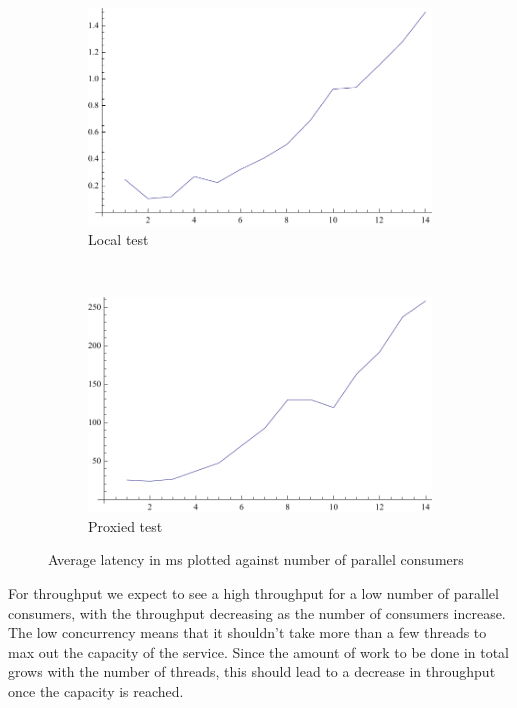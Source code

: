 \documentclass[11pt,a4paper]{article}
\begin{document}
\begin{figure}[h!]
    \centering
    \begin{subfigure}[b]{.4\textwidth}
        \includegraphics[width=\textwidth]{../analysis/latency-local-kris.pdf}
        \caption{Local test}
    \end{subfigure}
    \,
    \begin{subfigure}[b]{.4\textwidth}
        \includegraphics[width=\textwidth]{../analysis/latency-remote-kris.pdf}
        \caption{Proxied test}
    \end{subfigure}
    \caption{Average latency in ms plotted against number of parallel consumers}
    \label{latency}
\end{figure}

For throughput we expect to see a high throughput for a low number of parallel
consumers, with the throughput decreasing as the number of consumers increase.
The low concurrency means that it shouldn't take more than a few threads to
max out the capacity of the service. Since the amount of work to be done in
total grows with the number of threads, this should lead to a decrease in
throughput once the capacity is reached.
\end{document}

